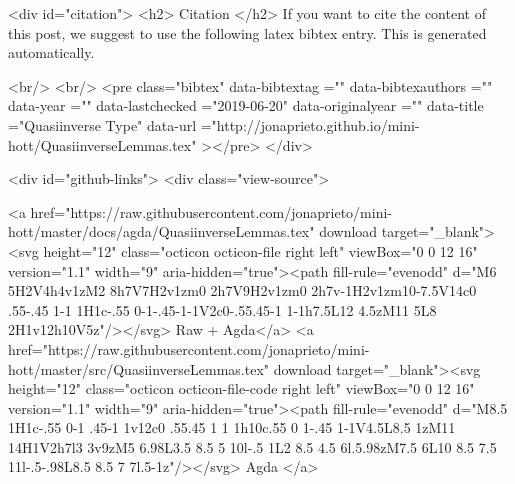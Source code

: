   
  <div id="citation">
  <h2> Citation </h2>
  If you want to cite the content of this post,
  we suggest to use the following latex bibtex entry.
  This is generated automatically.

  <br/>
  <br/>
  <pre class="bibtex"
       data-bibtextag =""
       data-bibtexauthors =""
       data-year =""
       data-lastchecked ="2019-06-20"
       data-originalyear =""
       data-title ="Quasiinverse Type"
       data-url ="http://jonaprieto.github.io/mini-hott/QuasiinverseLemmas.tex"
  ></pre>
  </div>
  

  <div id="github-links">
    <div class="view-source">
      
        <a href="https://raw.githubusercontent.com/jonaprieto/mini-hott/master/docs/agda/QuasiinverseLemmas.tex" download target="_blank"><svg height="12" class="octicon octicon-file right left" viewBox="0 0 12 16" version="1.1" width="9" aria-hidden="true"><path fill-rule="evenodd" d="M6 5H2V4h4v1zM2 8h7V7H2v1zm0 2h7V9H2v1zm0 2h7v-1H2v1zm10-7.5V14c0 .55-.45 1-1 1H1c-.55 0-1-.45-1-1V2c0-.55.45-1 1-1h7.5L12 4.5zM11 5L8 2H1v12h10V5z"/></svg> Raw + Agda</a>
        <a href="https://raw.githubusercontent.com/jonaprieto/mini-hott/master/src/QuasiinverseLemmas.tex" download target="_blank"><svg height="12" class="octicon octicon-file-code right left" viewBox="0 0 12 16" version="1.1" width="9" aria-hidden="true"><path fill-rule="evenodd" d="M8.5 1H1c-.55 0-1 .45-1 1v12c0 .55.45 1 1 1h10c.55 0 1-.45 1-1V4.5L8.5 1zM11 14H1V2h7l3 3v9zM5 6.98L3.5 8.5 5 10l-.5 1L2 8.5 4.5 6l.5.98zM7.5 6L10 8.5 7.5 11l-.5-.98L8.5 8.5 7 7l.5-1z"/></svg> Agda </a>
      
